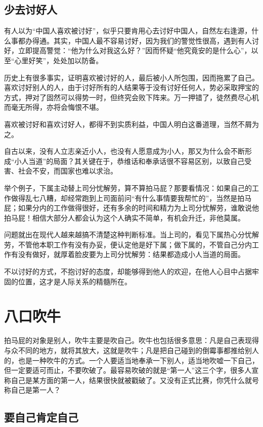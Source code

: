 \documentclass[fontset=fandol, a4paper, 12pt, openright]{ctexbook}
\begin{document}
\section{少去讨好人}

有人以为“中国人喜欢被讨好”，似乎只要肯用心去讨好中国人，自然左右逢源，什么事都办得通。其实，中国人最不容易讨好，因为我们的警觉性很高，遇到有人讨好，立即提高警觉：“他为什么对我这么好？”因而怀疑“他究竟安的是什么心”，以至“心里好笑”，处处加以防备。

历史上有很多事实，证明喜欢被讨好的人，最后被小人所包围，因而拖累了自己。喜欢讨好别人的人，由于讨好所有的人结果等于没有讨好任何人，势必采取押宝的方式，押对了固然可以得势一时，但终究会败下阵来。万一押错了，徒然费尽心机而毫无所得，亦将会悔恨不堪。

喜欢被讨好和喜欢讨好人，都得不到实质利益，中国人明白这番道理，当然不屑为之。

自古以来，没有人立志亲近小人，也没有人愿意成为小人，那又为什么会不断形成“小人当道”的局面？其关键在于，恭维话和奉承话很不容易区别，以致自己受害、社会不安，而国家也难以求治。

举个例子，下属主动替上司分忧解劳，算不算拍马屁？那要看情况：如果自己的工作做得乱七八糟，却经常跑到上司面前问“有什么事情要我帮忙的”，当然是拍马屁；如果分内的工作做得很好，还有多余的时间和精力为上司分忧解劳，谁敢说他拍马屁！相信大部分人都会认为这个人确实不简单，有机会升迁，非他莫属。

问题就出在现代人越来越搞不清楚这种判断标准。当上司的，看见下属热心分忧解劳，不管他本职工作有没有办妥，便认定他是好下属；做下属的，不管自己分内工作有没有做好，就厚着脸皮要为上司分忧解劳：结果都造成小人当道的局面。

不以讨好的方式，不抱讨好的态度，却能够得到他人的欢迎，在他人心目中占据牢固的位置，这才是人际关系的精髓所在。


\chapter{八口吹牛}
拍马屁的对象是别人，吹牛主要是吹自己。吹牛也包括很多意思：凡是自己表现得与众不同的地方，就将其放大，这就是吹牛；凡是把自己碰到的倒霉事都推给别人的，也是一种吹牛的方式。一个人要适当地奉承一下别人，适当地吹嘘一下自己，但一定要适可而止，不要吹破了。最容易吹破的就是“第一人”这三个字，很多人宣称自己是某方面的第一人，结果很快就被戳破了。又没有正式比赛，你凭什么就号称自己是第一人？

\section{要自己肯定自己}
\end{document}
